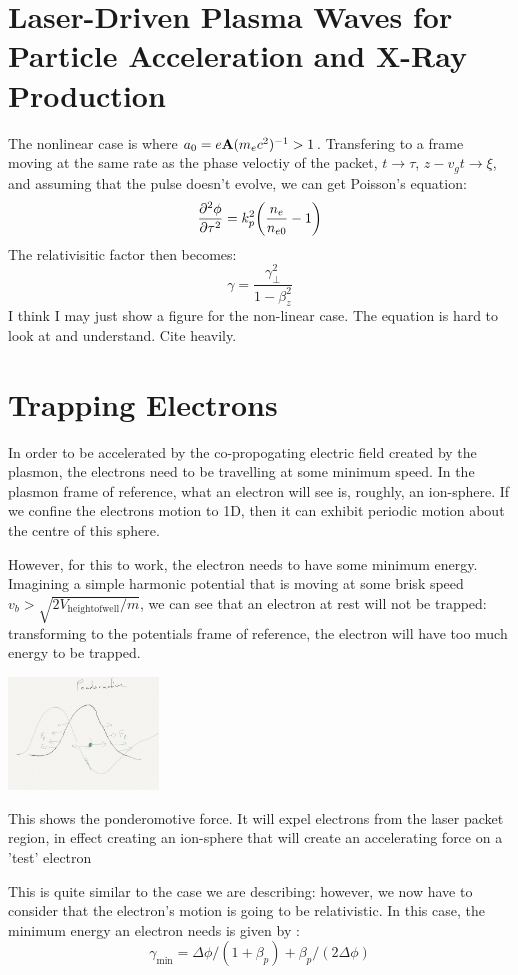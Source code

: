 \documentclass[12pt, titlepage]{caesar_book}
\begin{document}
\section{Laser-Driven Plasma Waves for Particle Acceleration and X-Ray Production}
The nonlinear case is where $a_0 = e\vb{A}(m_e c^2)^{-1} > 1$. Transfering to
a frame moving at the same rate as the phase veloctiy of the packet,  $t\rightarrow \tau$, $z-v_g t \rightarrow \xi $, and assuming that the pulse 
doesn't evolve, we can get Poisson's equation:
\begin{equation}
    \pdv[2]{\phi}{\tau} = k_p^2 \qty( \frac{n_e}{n_{e0}} - 1)
\end{equation}
The relativisitic factor then becomes:
\begin{equation}
    \gamma = \frac{\gamma_\bot^2}{1-\beta_z^2} 
\end{equation}
I think I may just show a figure for the non-linear case. The equation is hard 
to look at and understand. Cite heavily.
\section{Trapping Electrons}
In order to be accelerated by the co-propogating electric field created by the plasmon, the electrons need to be travelling at some minimum speed. In the plasmon frame of reference, what an electron will see is, roughly, an ion-sphere. If we confine the electrons motion to 1D, then it can exhibit periodic motion about the centre of this sphere. 

However, for this to work, the electron needs to have some minimum energy. Imagining a simple harmonic potential that is moving at some brisk speed $v_b > \sqrt{2 V_\mathrm{height of well}/m} $, we can see that an electron at rest will not be trapped: transforming to the potentials frame of reference, the electron will have too much energy to be trapped.
\begin{marginfigure}
\includegraphics[width=4cm]{./pf.png}
\caption{This shows the ponderomotive force. It will expel electrons from the laser
packet region, in effect creating an ion-sphere that will create an accelerating force
on a 'test' electron}
\end{marginfigure}
This is quite similar to the case we are describing: however, we now have to consider that the electron's motion is going to be relativistic. In this case, the minimum energy an electron needs is given by :
\begin{equation}
\gamma_\mathrm{min} = \Delta \phi / (1+\beta_p) + \beta_p/(2 \Delta \phi)
\end{equation}
\end{document}
